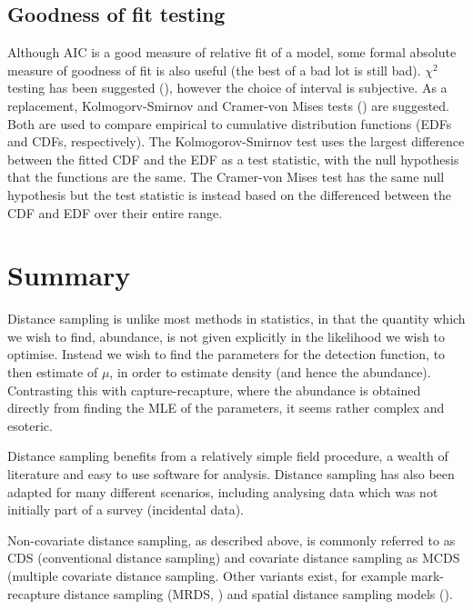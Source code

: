 \subsection{Goodness of fit testing}
Although AIC is a good measure of relative fit of a model, some formal absolute measure of goodness of fit is also useful (the best of a bad lot is still bad). $\chi^2$ testing has been suggested (\cite[pp. 69-71]{IDS}), however the choice of interval is subjective. As a replacement, Kolmogorv-Smirnov and Cramer-von Mises tests (\cite[pp. 385-389]{ADS}) are suggested. Both are used to compare empirical to cumulative distribution functions (EDFs and CDFs, respectively). The Kolmogorov-Smirnov test uses the largest difference between the fitted CDF and the EDF as a test statistic, with the null hypothesis that the functions are the same. The Cramer-von Mises test has the same null hypothesis but the test statistic is instead based on the differenced between the CDF and EDF over their entire range.

\section{Summary}
Distance sampling is unlike most methods in statistics, in that the quantity which we wish to find, abundance, is not given explicitly in the likelihood we wish to optimise. Instead we wish to find the parameters for the detection function, to then estimate of $\mu$, in order to estimate density (and hence the abundance). Contrasting this with capture-recapture, where the abundance is obtained directly from finding the MLE of the parameters, it seems rather complex and esoteric. 

Distance sampling benefits from a relatively simple field procedure, a wealth of literature and easy to use software for analysis. Distance sampling has also been adapted for many different scenarios, including analysing data which was not initially part of a survey (incidental data).

Non-covariate distance sampling, as described above, is commonly referred to as CDS (conventional distance sampling) and covariate distance sampling as MCDS (multiple covariate distance sampling. Other variants exist, for example mark-recapture distance sampling (MRDS, \cite{mrdspaper}) and spatial distance sampling models (\cite[chapter 4]{ADS}).

